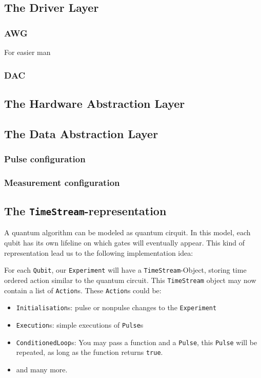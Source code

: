 \documentclass[a4paper,12pt]{article}
\begin{document}
\subsection{The Driver Layer}

\subsubsection{AWG}
For easier man
\subsubsection{DAC}

\subsection{The Hardware Abstraction Layer}

\subsection{The Data Abstraction Layer}

\subsubsection{Pulse configuration}

\subsubsection{Measurement configuration}

\subsection{The \texttt{TimeStream}-representation}
A quantum algorithm can be modeled as quantum cirquit. In this model, each qubit has its own lifeline on which gates will eventually appear. This kind of representation lead us to the following implementation idea:

For each \texttt{Qubit}, our \texttt{Experiment} will have a \texttt{TimeStream}-Object, storing time ordered action similar to the quantum circuit. 
This \texttt{TimeStream} object may now contain a list of \texttt{Action}s. These \texttt{Action}s could be:
\begin{itemize} \itemsep-0.5pt
 \item \texttt{Initialisation}s: pulse or nonpulse changes to the \texttt{Experiment}
 \item \texttt{Execution}s: simple executions of \texttt{Pulse}s
 \item \texttt{ConditionedLoop}s: You may pass a function and a \texttt{Pulse}, this \texttt{Pulse} will be repeated, as long as the function returns \texttt{true}.
 \item and many more.
\end{itemize}
\end{document}
